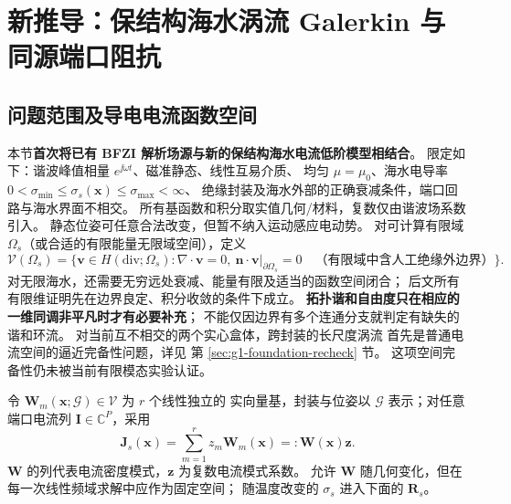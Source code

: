 \section{新推导：保结构海水涡流 Galerkin 与同源端口阻抗}\label{sec:galerkin}
\subsection{问题范围及导电电流函数空间}
本节\textbf{首次将已有 BFZI 解析场源与新的保结构海水电流低阶模型相结合}。
限定如下：谐波峰值相量 \(e^{\jj\omega t}\)、磁准静态、线性互易介质、
均匀 \(\mu=\mu_0\)、海水电导率 \(0<\sigma_{\min}\leq\sigma_s(\bm x)\leq\sigma_{\max}<\infty\)、
绝缘封装及海水外部的正确衰减条件，端口回路与海水界面不相交。
所有基函数和积分取实值几何/材料，复数仅由谐波场系数引入。
静态位姿可任意合法改变，但暂不纳入运动感应电动势。
对可计算有限域 \(\Omega_s\)（或合适的有限能量无限域空间），定义
\begin{equation}
\mathcal V(\Omega_s)
=\{\bm v\in H(\mathrm{div};\Omega_s):
\nabla\cdot\bm v=0,\ 
\bm n\cdot\bm v|_{\partial\Omega_s}=0\quad
\text{（有限域中含人工绝缘外边界）}\}.
\label{eq:sea-solenoidal-space}
\end{equation}
对无限海水，还需要无穷远处衰减、能量有限及适当的函数空间闭合；
后文所有有限维证明先在边界良定、积分收敛的条件下成立。
\textbf{拓扑谐和自由度只在相应的一维同调非平凡时才有必要补充}；
不能仅因边界有多个连通分支就判定有缺失的谐和环流。
对当前互不相交的两个实心盒体，跨封装的长尺度涡流
首先是普通电流空间的逼近完备性问题，详见
第 \ref{sec:g1-foundation-recheck} 节。
这项空间完备性仍未被当前有限模态实验认证。

令 \(\bm W_m(\bm x;\mathcal G)\in\mathcal V\) 为 \(r\) 个线性独立的
实向量基，封装与位姿以 \(\mathcal G\) 表示；对任意端口电流列
\(\bm I\in\mathbb C^P\)，采用
\begin{equation}
\bm J_s(\bm x)=\sum_{m=1}^r z_m\bm W_m(\bm x)
=:\bm W(\bm x)\bm z .
\label{eq:sea-reduced-current}
\end{equation}
\(\bm W\) 的列代表电流密度模式，\(\bm z\) 为复数电流模式系数。
允许 \(\bm W\) 随几何变化，但在每一次线性频域求解中应作为固定空间；
随温度改变的 \(\sigma_s\) 进入下面的 \(\bm R_s\)。

